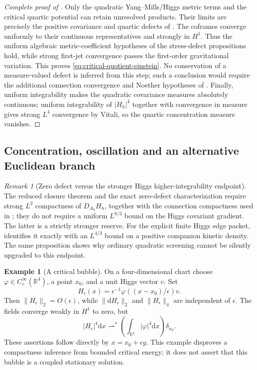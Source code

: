 \documentclass[11pt]{article}
\numberwithin{equation}{section}
\theoremstyle{definition}
\newtheorem{example}[example]{Example}
\theoremstyle{remark}
\newtheorem{remark}[remark]{Remark}
\newcommand{\R}{\mathbb R}
\newcommand{\dd}{\mathrm d}
\newcommand{\norm}[1]{\lVert#1\rVert}
\newcommand{\abs}[1]{\lvert#1\rvert}
\begin{document}
\begin{proof}[Complete proof of ]
Only the quadratic Yang--Mills/Higgs metric terms and the critical quartic
potential can retain unresolved products.  Their limits are precisely the
positive covariance and quartic defects of
.  The coframes converge uniformly to their continuous representatives and
strongly in $H^1$. Thus the uniform algebraic metric-coefficient hypotheses
of the stress-defect propositions hold, while strong first-jet convergence
passes the first-order gravitational variation. This proves
\eqref{eq:critical-quotient-einstein}. No conservation of a measure-valued
defect is inferred from this step; such a conclusion would require the
additional connection convergence and Noether hypotheses of
.  Finally, uniform
integrability makes the quadratic covariance measures absolutely continuous;
uniform integrability of $|H_h|^4$ together with convergence in measure gives
strong $L^4$ convergence by Vitali, so the quartic concentration measure
vanishes.
\end{proof}

\subsection{Concentration, oscillation and an alternative Euclidean branch}

\begin{remark}[Zero defect versus the stronger Higgs higher-integrability endpoint]
\label{rem:Higgs-higher-integrability-boundary}
The reduced closure theorem and the exact zero-defect characterization require
strong $L^2$ compactness of $D_{A_h}H_h$, together with the connection
compactness used in ; they do not require
a uniform $L^{8/3}$ bound on the Higgs covariant gradient.  The latter is a
strictly stronger reserve.  For the explicit finite Higgs edge packet,
 identifies it exactly with an
$L^{4/3}$ bound on a positive companion kinetic density.  The same proposition
shows why ordinary quadratic screening cannot be silently upgraded to this
endpoint.
\end{remark}


\begin{example}[A critical bubble]
\label{ex:bubble}
On a four-dimensional chart choose $\varphi\in C_c^\infty(\R^4)$, a point $x_0$, and a unit Higgs vector $v$. Set
\[
 H_\epsilon(x)=\epsilon^{-1}\varphi((x-x_0)/\epsilon)v.
\]
Then $\norm{H_\epsilon}_2=O(\epsilon)$, while $\norm{\dd H_\epsilon}_2$ and $\norm{H_\epsilon}_4$ are independent of $\epsilon$. The fields converge weakly in $H^1$ to zero, but
\[
 \abs{H_\epsilon}^4\dd x\rightharpoonup^*
 \left(\int_{\R^4}\abs\varphi^4\dd x\right)\delta_{x_0}.
\]
These assertions follow directly by $x=x_0+\epsilon y$. This example disproves a compactness inference from bounded critical energy; it does not assert that this bubble is a coupled stationary solution.
\end{example}
\end{document}
